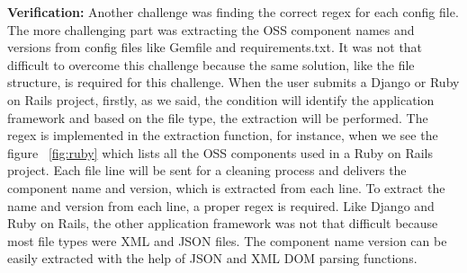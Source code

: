 \textbf{Verification:} Another challenge was finding the correct regex for each config file. The more challenging part was extracting the \acs{OSS} component names and versions from config files like Gemfile and requirements.txt. It was not that difficult to overcome this challenge because the same solution, like the file structure, is required for this challenge. When the user submits a Django or Ruby on Rails project, firstly, as we said, the condition will identify the application framework and based on the file type, the extraction will be performed. The regex is implemented in the extraction function, for instance, when we see the figure ~\ref{fig:ruby} which lists all the OSS components used in a Ruby on Rails project. Each file line will be sent for a cleaning process and delivers the component name and version, which is extracted from each line. To extract the name and version from each line, a proper regex is required. Like Django and Ruby on Rails, the other application framework was not that difficult because most file types were XML and JSON files. The component name version can be easily extracted with the help of JSON and XML DOM parsing functions.

%
